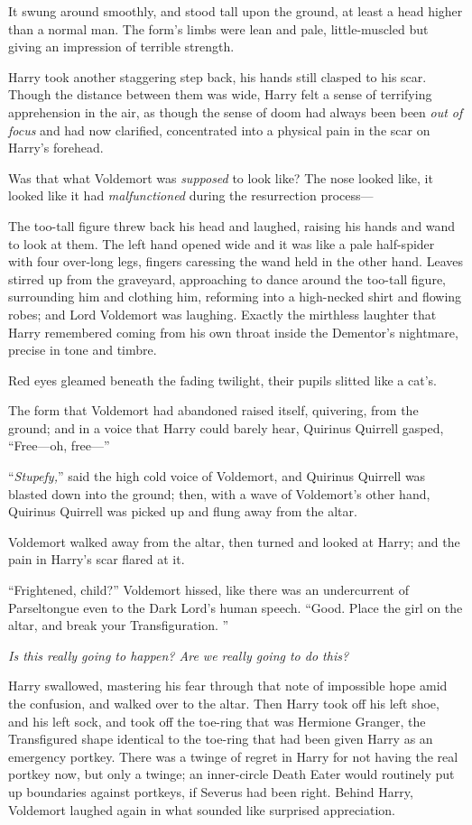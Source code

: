 It swung around smoothly, and stood tall upon the ground, at least a head higher than a normal man. The form’s limbs were lean and pale, little-muscled but giving an impression of terrible strength.

Harry took another staggering step back, his hands still clasped to his scar. Though the distance between them was wide, Harry felt a sense of terrifying apprehension in the air, as though the sense of doom had always been been \emph{out of focus} and had now clarified, concentrated into a physical pain in the scar on Harry’s forehead.

Was that what Voldemort was \emph{supposed} to look like? The nose looked like, it looked like it had \emph{malfunctioned} during the resurrection process—

The too-tall figure threw back his head and laughed, raising his hands and wand to look at them. The left hand opened wide and it was like a pale half-spider with four over-long legs, fingers caressing the wand held in the other hand. Leaves stirred up from the graveyard, approaching to dance around the too-tall figure, surrounding him and clothing him, reforming into a high-necked shirt and flowing robes; and Lord Voldemort was laughing. Exactly the mirthless laughter that Harry remembered coming from his own throat inside the Dementor’s nightmare, precise in tone and timbre.

Red eyes gleamed beneath the fading twilight, their pupils slitted like a cat’s.

The form that Voldemort had abandoned raised itself, quivering, from the ground; and in a voice that Harry could barely hear, Quirinus Quirrell gasped, “Free—oh, free—”

“\emph{Stupefy,}” said the high cold voice of Voldemort, and Quirinus Quirrell was blasted down into the ground; then, with a wave of Voldemort’s other hand, Quirinus Quirrell was picked up and flung away from the altar.

Voldemort walked away from the altar, then turned and looked at Harry; and the pain in Harry’s scar flared at it.

“Frightened, child?” Voldemort hissed, like there was an undercurrent of Parseltongue even to the Dark Lord’s human speech. “Good. Place the girl on the altar, and break your Transfiguration. ”

\emph{Is this really going to happen? Are we really going to do this?}

Harry swallowed, mastering his fear through that note of impossible hope amid the confusion, and walked over to the altar. Then Harry took off his left shoe, and his left sock, and took off the toe-ring that was Hermione Granger, the Transfigured shape identical to the toe-ring that had been given Harry as an emergency portkey. There was a twinge of regret in Harry for not having the real portkey now, but only a twinge; an inner-circle Death Eater would routinely put up boundaries against portkeys, if Severus had been right. Behind Harry, Voldemort laughed again in what sounded like surprised appreciation.

